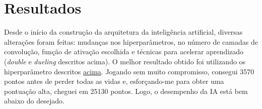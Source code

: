
\chapter{Resultados}
\label{cap:resultados}

Desde o início da construção da arquitetura da inteligência artificial, diversas alterações foram feitas: mudanças nos hiperparâmetros, no número de camadas de convolução, função de ativação escolhida e técnicas para acelerar aprendizado (\textit{double} e \textit{dueling} descritos acima).
O melhor resultado obtido foi utilizando os hiperparâmetro descritos \hyperref[table:2]{acima}.
Jogando sem muito compromisso, consegui 3570 pontos antes de perder todas as vidas e, esforçando-me para obter uma pontuação alta, cheguei em 25130 pontos.
Logo, o desempenho da IA está bem abaixo do desejado.

